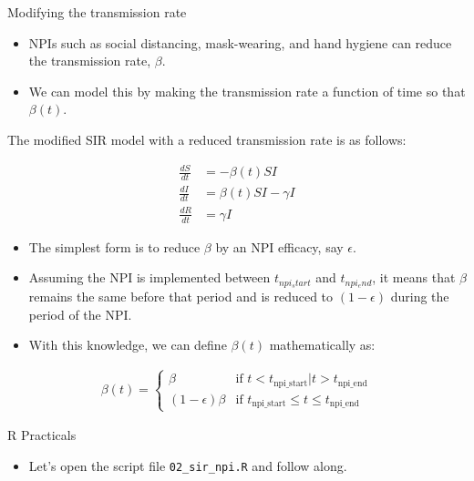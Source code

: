 \documentclass[
  ignorenonframetext,
]{beamer}
\providecommand{\tightlist}{%
  \setlength{\itemsep}{0pt}\setlength{\parskip}{0pt}}\usepackage{longtable,booktabs,array}
\begin{document}
\begin{frame}
\begin{block}{Modifying the transmission rate}
\label{modifying-the-transmission-rate}
\begin{itemize}
\item
  NPIs such as social distancing, mask-wearing, and hand hygiene can
  reduce the transmission rate, \(\beta\).
\item
  We can model this by making the transmission rate a function of time
  so that \(\beta(t)\).
\end{itemize}
\end{block}
\end{frame}

\begin{frame}
The modified SIR model with a reduced transmission rate is as follows:

\begin{align*}
\frac{dS}{dt} & = -\beta(t) S I \\
\frac{dI}{dt} & = \beta (t) S I - \gamma I \\
\frac{dR}{dt} & = \gamma I
\end{align*}
\end{frame}

\begin{frame}
\begin{itemize}
\item
  The simplest form is to reduce \(\beta\) by an NPI efficacy, say
  \(\epsilon\).
\item
  Assuming the NPI is implemented between \(t_{npi_start}\) and
  \(t_{npi_end}\), it means that \(\beta\) remains the same before that
  period and is reduced to \(( 1- \epsilon)\) during the period of the
  NPI.
\item
  With this knowledge, we can define \(\beta(t)\) mathematically as:
\end{itemize}

\begin{align*}
\beta(t) = \begin{cases}
\beta & \text{if } t < t_{\text{npi_start}} | t > t_{\text{npi_end}} \\
(1 - \epsilon) \beta & \text{if } t_{\text{npi_start}} \le t \le t_{\text{npi_end}}
\end{cases}
\end{align*}
\end{frame}

\begin{frame}[fragile]
\begin{block}{R Practicals}
\label{r-practicals-2}
\begin{itemize}
\tightlist
\item
  Let's open the script file \texttt{02\_sir\_npi.R} and follow along.
\end{itemize}
\end{block}
\end{frame}
\end{document}
